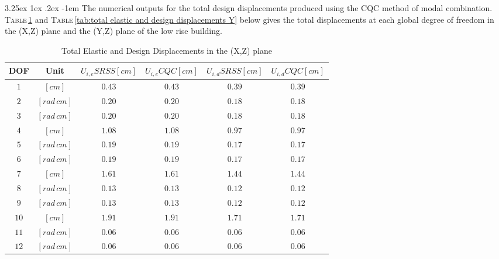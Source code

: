 \documentclass[11pt,a4paper,titlepage]{report}
\makeatletter
\renewcommand\paragraph{\@startsection{paragraph}{5}{\z@}%
  {3.25ex \@plus1ex \@minus.2ex}%
  {-1em}%
  {\normalfont\normalsize\bfseries}}
\makeatother
\begin{document}
\paragraph{}The numerical outputs for the total design displacements produced using the CQC method of modal combination. \textsc{Table}\,\ref{tab:total elastic and design displacements X} and  \textsc{Table}\,\ref{tab:total elastic and design displacements Y} below gives the total displacements at each global degree of freedom in the (X,Z) plane and the (Y,Z) plane of the low rise building.
\begin{table}[h]
    \centering
    \begin{tabular}{c|c|c|c|c|c}
         DOF & Unit & $U_{i,e} SRSS [cm]$ & $U_{i,e} CQC [cm]$ & $U_{i,d} SRSS [cm]$ & $U_{i,d} CQC [cm]$\\
         \hline
        $1$ & $[cm]$ & $0.43$ & $0.43$ & $0.39$ & $0.39$ \\
        $2$ & $[rad\,cm]$ & $0.20$ & $0.20$ & $0.18$ & $0.18$ \\
        $3$ & $[rad\,cm]$ &$0.20$ & $0.20$ & $0.18$ & $0.18$ \\
        $4$ & $[cm]$ & $1.08$ & $1.08$ & $0.97$ & $0.97$ \\
        $5$ & $[rad\,cm]$ &$0.19$ & $0.19$ & $0.17$ & $0.17$ \\
        $6$ & $[rad\,cm]$ &$0.19$ & $0.19$ & $0.17$ & $0.17$ \\
        $7$ & $[cm]$ & $1.61$ & $1.61$ & $1.44$ & $1.44$ \\
        $8$ & $[rad\,cm]$ &$0.13$ & $0.13$ & $0.12$ & $0.12$ \\
        $9$ & $[rad\,cm]$ &$0.13$ & $0.13$ & $0.12$ & $0.12$ \\
        $10$ & $[cm]$ & $1.91$ & $1.91$ & $1.71$ & $1.71$ \\
        $11$ & $[rad\,cm]$ &$0.06$ & $0.06$ & $0.06$ & $0.06$ \\
        $12$ & $[rad\,cm]$ &$0.06$ & $0.06$ & $0.06$ & $0.06$ \\
    \end{tabular}
    \caption{Total Elastic and Design Displacements in the (X,Z) plane}
    \label{tab:total elastic and design displacements X}
\end{table}
\end{document}
